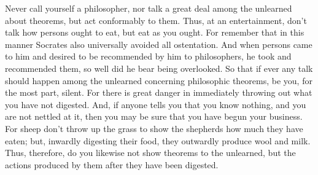 Never call  yourself a philosopher, nor  talk a great deal  among the unlearned
about theorems, but  act conformably to them. Thus, at  an entertainment, don't
talk how persons ought to eat, but eat  as you ought. For remember that in this
manner Socrates also universally avoided all ostentation. And when persons came
to  him and  desired to  be recommended  by him  to philosophers,  he took  and
recommended them,  so well did  he bear being overlooked.  So that if  ever any
talk should happen among the unlearned concerning philosophic theorems, be you,
for the  most part, silent. For  there is great danger  in immediately throwing
out what you have not digested. And, if anyone tells you that you know nothing,
and you are  not nettled at it, then  you may be sure that you  have begun your
business. For  sheep don't throw  up the grass to  show the shepherds  how much
they have  eaten; but,  inwardly digesting their  food, they  outwardly produce
wool  and milk.  Thus, therefore,  do  you likewise  not show  theorems to  the
unlearned, but the actions produced by them after they have been digested.
